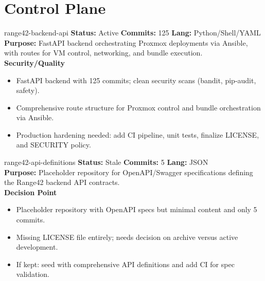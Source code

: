 \documentclass[aspectratio=169]{beamer}
\begin{document}
\section{Control Plane}

\begin{frame}{range42-backend-api \; \faProjectDiagram}
  \textbf{Status:} Active \hfill \textbf{Commits:} 125 \hfill \textbf{Lang:} Python/Shell/YAML\\[2mm]
  \textbf{Purpose:} FastAPI backend orchestrating Proxmox deployments via Ansible, with routes for VM control, networking, and bundle execution.\\[2mm]
  \textbf{Security/Quality}
  \begin{itemize}
    \item FastAPI backend with 125 commits; clean security scans (bandit, pip-audit, safety).
    \item Comprehensive route structure for Proxmox control and bundle orchestration via Ansible.
    \item Production hardening needed: add CI pipeline, unit tests, finalize LICENSE, and SECURITY policy.
  \end{itemize}
\end{frame}

\begin{frame}{range42-api-definitions \; \faSitemap}
  \textbf{Status:} Stale \hfill \textbf{Commits:} 5 \hfill \textbf{Lang:} JSON\\[2mm]
  \textbf{Purpose:} Placeholder repository for OpenAPI/Swagger specifications defining the Range42 backend API contracts.\\[2mm]
  \textbf{Decision Point}
  \begin{itemize}
    \item Placeholder repository with OpenAPI specs but minimal content and only 5 commits.
    \item Missing LICENSE file entirely; needs decision on archive versus active development.
    \item If kept: seed with comprehensive API definitions and add CI for spec validation.
  \end{itemize}
\end{frame}
\end{document}
